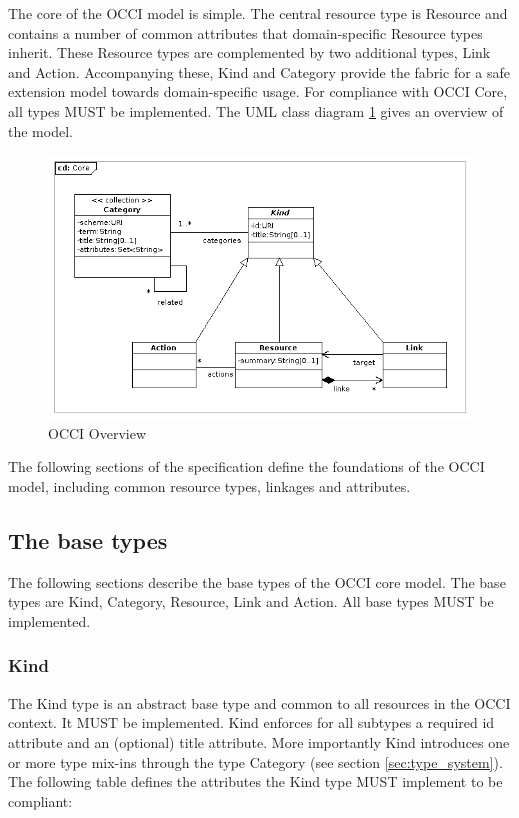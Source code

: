 \documentclass[10pt,a4paper]{article}
\begin{document}
The core of the OCCI model is simple. The central resource type is Resource and contains a number of common attributes that domain-specific Resource types inherit. These Resource types are complemented by two additional types, Link and Action. Accompanying these, Kind and Category provide the fabric for a safe extension model towards domain-specific usage. For compliance with OCCI Core, all types MUST be implemented. The UML class diagram \ref{fig:occi_core} gives an overview of the model.

\clearpage
\begin{figure}[!h]
	\centering
	\includegraphics[scale=0.5]{figs/core_model.png}
	\caption{OCCI Overview}
	\label{fig:occi_core}
\end{figure}

The following sections of the specification define the foundations of the OCCI model, including common resource types, linkages and attributes.

\subsection{The base types}
The following sections describe the base types of the OCCI core model. The base types are Kind, Category, Resource, Link and Action. All base types MUST be implemented.

\subsubsection{Kind}
The Kind type is an abstract base type and common to all resources in the OCCI context. It MUST be implemented. Kind enforces for all subtypes a required id attribute and an (optional) title attribute. More importantly Kind introduces one or more type mix-ins through the type Category (see section \ref{sec:type_system}). The following table defines the attributes the Kind type MUST implement to be compliant:
\end{document}
